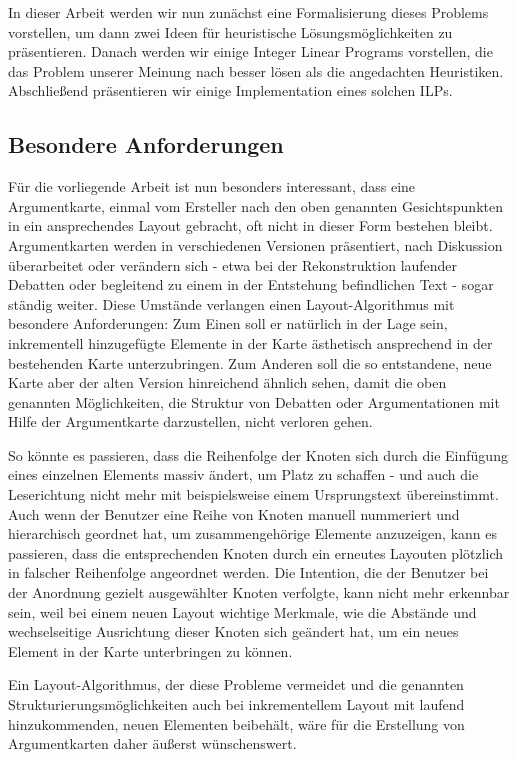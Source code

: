 In dieser Arbeit werden wir nun zunächst eine Formalisierung dieses Problems vorstellen, um dann zwei Ideen für heuristische Lösungsmöglichkeiten zu präsentieren. Danach werden wir einige Integer Linear Programs vorstellen, die das Problem unserer Meinung nach besser lösen als die angedachten Heuristiken. Abschließend präsentieren wir einige Implementation eines solchen ILPs.

\subsection{Besondere Anforderungen}
\label{sub:tasks}

Für die vorliegende Arbeit ist nun besonders interessant, dass eine Argumentkarte, einmal vom Ersteller nach den oben genannten Gesichtspunkten in ein ansprechendes Layout gebracht, oft nicht in dieser Form bestehen bleibt. Argumentkarten werden in verschiedenen Versionen präsentiert, nach Diskussion überarbeitet oder verändern sich - etwa bei der Rekonstruktion laufender Debatten oder begleitend zu einem in der Entstehung befindlichen Text - sogar ständig weiter. Diese Umstände verlangen einen Layout-Algorithmus mit besondere Anforderungen: Zum Einen soll er natürlich in der Lage sein, inkrementell hinzugefügte Elemente in der Karte ästhetisch ansprechend in der bestehenden Karte unterzubringen. Zum Anderen soll die so entstandene, neue Karte aber der alten Version hinreichend ähnlich sehen, damit die oben genannten Möglichkeiten, die Struktur von Debatten oder Argumentationen mit Hilfe der Argumentkarte darzustellen, nicht verloren gehen.

 So könnte es passieren, dass die Reihenfolge der Knoten sich durch die Einfügung eines einzelnen Elements massiv ändert, um Platz zu schaffen - und auch die Leserichtung nicht mehr mit beispielsweise einem Ursprungstext übereinstimmt. Auch wenn der Benutzer eine Reihe von Knoten manuell nummeriert und hierarchisch geordnet hat, um zusammengehörige Elemente anzuzeigen, kann es passieren, dass die entsprechenden Knoten durch ein erneutes Layouten plötzlich in falscher Reihenfolge angeordnet werden. Die Intention, die der Benutzer bei der Anordnung gezielt ausgewählter Knoten verfolgte, kann nicht mehr erkennbar sein, weil bei einem neuen Layout wichtige Merkmale, wie die Abstände und wechselseitige Ausrichtung dieser Knoten sich geändert hat, um ein neues Element in der Karte unterbringen zu können.

 Ein Layout-Algorithmus, der diese Probleme vermeidet und die genannten Strukturierungsmöglichkeiten auch bei inkrementellem Layout mit laufend hinzukommenden, neuen Elementen beibehält, wäre für die Erstellung von Argumentkarten daher äußerst wünschenswert.

